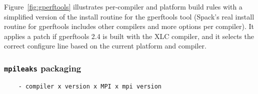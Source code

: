Figure~\ref{fig:gperftools} illustrates per-compiler and platform build rules with
a simplified version of the install routine for the gperftools tool (Spack's real
install routine for gperftools includes other compilers and more options per
compiler).  It applies a patch if gperftools 2.4 is built with the XLC compiler,
and it selects the correct configure line based on the current platform and compiler.

\subsubsection{{\tt mpileaks} packaging}
\begin{verbatim}
	- compiler x version x MPI x mpi version
\end{verbatim}
